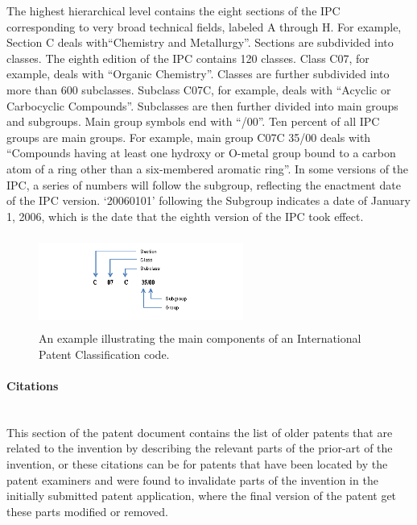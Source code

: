The highest hierarchical level contains the eight sections of the IPC corresponding
to very broad technical fields, labeled A through H. For example, Section C deals
with``Chemistry and Metallurgy''. Sections are subdivided into classes. The eighth edition of the IPC contains 120
classes. Class C07, for example, deals with ``Organic Chemistry''. Classes are further subdivided into more than 600 subclasses. Subclass C07C, for example, deals with ``Acyclic or Carbocyclic Compounds''. Subclasses are then further divided into main groups and subgroups. Main group symbols end with ``/00''. Ten percent of all IPC groups are main
groups. For example, main group C07C 35/00 deals with ``Compounds having at
least one hydroxy or O-metal group bound to a carbon atom of a ring other than
a six-membered aromatic ring''. In some versions of the IPC, a series of numbers will follow the subgroup, reflecting
the enactment date of the IPC version. `20060101' following the Subgroup
indicates a date of January 1, 2006, which is the date that the eighth version of
the IPC took effect. 
\begin{figure}[t!]
   \centering
   \includegraphics[width=0.60\textwidth,height=30mm]{figs/IPCexample.jpg}
   \caption{An example illustrating the main components of an International Patent Classification code.}   
   \label{fig:ipcexample} 
\end{figure}
\paragraph{Citations}
\ \\ 
This section of the patent document contains the list of older patents that are related to the
invention by describing the relevant parts of the prior-art of the invention, or these citations can
be for patents that have been located by the patent examiners and were found to invalidate parts 
of the invention in the initially submitted patent application, where the final version of the patent
get these parts modified or removed.
